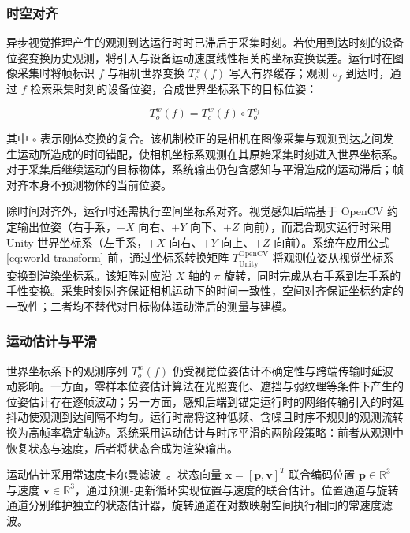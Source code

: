 \documentclass[9pt,twocolumn,letterpaper]{extarticle}
\begin{document}
\subsubsection{时空对齐}\label{sec:alignment}


异步视觉推理产生的观测到达运行时时已滞后于采集时刻。若使用到达时刻的设备位姿变换历史观测，将引入与设备运动速度线性相关的坐标变换误差。运行时在图像采集时将帧标识 $f$ 与相机世界变换 $T_c^w(f)$ 写入有界缓存；观测 $o_f$ 到达时，通过 $f$ 检索采集时刻的设备位姿，合成世界坐标系下的目标位姿：

\begin{equation}
T_o^w (f) = T_c^w (f) \circ T_o^{c_f}
\label{eq:world-transform}
\end{equation}


其中 $\circ$ 表示刚体变换的复合。该机制校正的是相机在图像采集与观测到达之间发生运动所造成的时间错配，使相机坐标系观测在其原始采集时刻进入世界坐标系。对于采集后继续运动的目标物体，系统输出仍包含感知与平滑造成的运动滞后；帧对齐本身不预测物体的当前位姿。

除时间对齐外，运行时还需执行空间坐标系对齐。视觉感知后端基于 OpenCV 约定输出位姿（右手系，$+X$ 向右、$+Y$ 向下、$+Z$ 向前），而混合现实运行时采用 Unity 世界坐标系（左手系，$+X$ 向右、$+Y$ 向上、$+Z$ 向前）。系统在应用公式 \ref{eq:world-transform} 前，通过坐标系转换矩阵 $T_{\mathrm{Unity}}^{\mathrm{OpenCV}}$ 将观测位姿从视觉坐标系变换到渲染坐标系。该矩阵对应沿 $X$ 轴的 $\pi$ 旋转，同时完成从右手系到左手系的手性变换。采集时刻对齐保证相机运动下的时间一致性，空间对齐保证坐标约定的一致性；二者均不替代对目标物体运动滞后的测量与建模。

\subsubsection{运动估计与平滑}\label{sec:smoothing}


世界坐标系下的观测序列 ${T_o^w (f)}$ 仍受视觉位姿估计不确定性与跨端传输时延波动影响。一方面，零样本位姿估计算法在光照变化、遮挡与弱纹理等条件下产生的位姿估计存在逐帧波动；另一方面，感知后端到锚定运行时的网络传输引入的时延抖动使观测到达间隔不均匀。运行时需将这种低频、含噪且时序不规则的观测流转换为高帧率稳定轨迹。系统采用运动估计与时序平滑的两阶段策略：前者从观测中恢复状态与速度，后者将状态合成为渲染输出。

运动估计采用常速度卡尔曼滤波~\cite{kalman1960new}。状态向量 $\mathbf{x} = [\mathbf{p}, \mathbf{v}]^T$ 联合编码位置 $\mathbf{p} \in \mathbb{R}^3$ 与速度 $\mathbf{v} \in \mathbb{R}^3$，通过预测-更新循环实现位置与速度的联合估计。位置通道与旋转通道分别维护独立的状态估计器，旋转通道在对数映射空间执行相同的常速度滤波。
\end{document}
